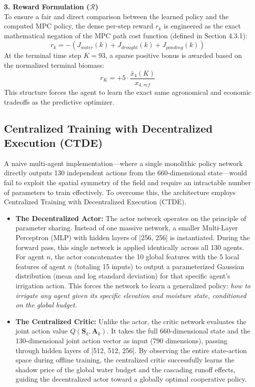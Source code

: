 \documentclass[11pt, a4paper]{article}
\begin{document}
\textbf{3. Reward Formulation ($\mathcal{R}$)} \\
To ensure a fair and direct comparison between the learned policy and the computed MPC policy, the dense per-step reward $r_k$ is engineered as the exact mathematical negation of the MPC path cost function (defined in Section 4.3.1):
\begin{equation}
    r_k = -\left( J_{water}(k) + J_{drought}(k) + J_{ponding}(k) \right)
\end{equation}
At the terminal time step $K = 93$, a sparse positive bonus is awarded based on the normalized terminal biomass:
\begin{equation}
    r_K = +5 \cdot \frac{\bar{x}_4(K)}{x_{4,ref}}
\end{equation}
This structure forces the agent to learn the exact same agronomical and economic tradeoffs as the predictive optimizer.

\subsection{Centralized Training with Decentralized Execution (CTDE)}
A naive multi-agent implementation---where a single monolithic policy network directly outputs 130 independent actions from the 660-dimensional state---would fail to exploit the spatial symmetry of the field and require an intractable number of parameters to train effectively. To overcome this, the architecture employs Centralized Training with Decentralized Execution (CTDE).

\begin{itemize}
    \item \textbf{The Decentralized Actor:} The actor network operates on the principle of parameter sharing. Instead of one massive network, a smaller Multi-Layer Perceptron (MLP) with hidden layers of [256, 256] is instantiated. During the forward pass, this single network is applied identically across all 130 agents. For agent $n$, the actor concatenates the 10 global features with the 5 local features of agent $n$ (totaling 15 inputs) to output a parameterized Gaussian distribution (mean and log standard deviation) for that specific agent's irrigation action. This forces the network to learn a generalized policy: \textit{how to irrigate any agent given its specific elevation and moisture state, conditioned on the global budget.}
    \item \textbf{The Centralized Critic:} Unlike the actor, the critic network evaluates the joint action value $Q(\mathbf{S}_k, \mathbf{A}_k)$. It takes the full 660-dimensional state and the 130-dimensional joint action vector as input (790 dimensions), passing through hidden layers of [512, 512, 256]. By observing the entire state-action space during offline training, the centralized critic successfully learns the shadow price of the global water budget and the cascading runoff effects, guiding the decentralized actor toward a globally optimal cooperative policy.
\end{itemize}
\end{document}
